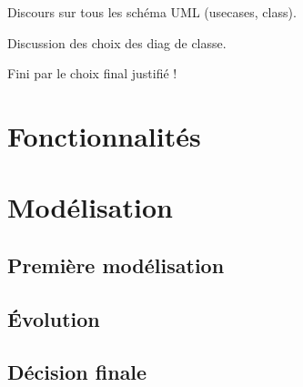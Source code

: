 Discours sur tous les schéma UML (usecases, class).

Discussion des choix des diag de classe.

Fini par le choix final justifié !

\section{Fonctionnalités}

\section{Modélisation}

\subsection{Première modélisation}
\subsection{Évolution}
\subsection{Décision finale}